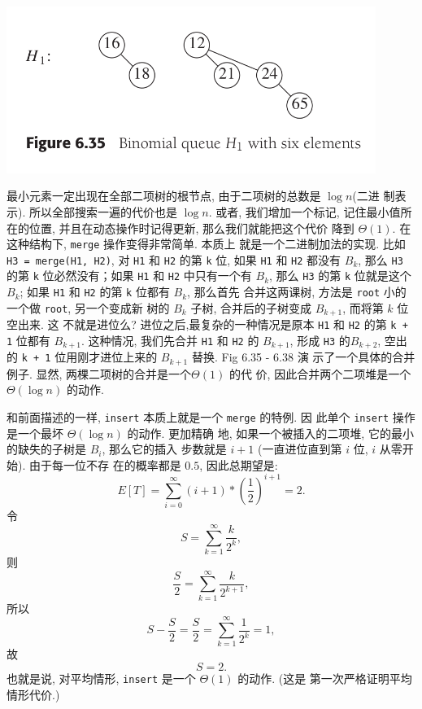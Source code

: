 \documentclass[a4paper]{ctexart}
\theoremstyle{definition}
\theoremstyle{definition}
\begin{document}
\begin{center}
  \includegraphics[width=0.9\textwidth]{images/B-tree.png}
\end{center}


最小元素一定出现在全部二项树的根节点, 由于二项树的总数是 $\log n$(二进
制表示). 所以全部搜索一遍的代价也是 $\log n$. 或者, 我们增加一个标记,
记住最小值所在的位置, 并且在动态操作时记得更新, 那么我们就能把这个代价
降到 $\Theta(1)$. 在这种结构下, \verb|merge| 操作变得非常简单. 本质上
就是一个二进制加法的实现. 比如 \verb|H3 = merge(H1, H2)|, 对 \verb|H1|
和 \verb|H2| 的第 \verb|k| 位, 如果 \verb|H1| 和 \verb|H2| 都没有
$B_k$, 那么 \verb|H3| 的第 \verb|k| 位必然没有；如果 \verb|H1| 和
\verb|H2| 中只有一个有 $B_k$, 那么 \verb|H3| 的第 \verb|k| 位就是这个
$B_k$; 如果 \verb|H1| 和 \verb|H2| 的第 \verb|k| 位都有 $B_k$, 那么首先
合并这两课树, 方法是 \verb|root| 小的一个做 \verb|root|, 另一个变成新
树的 $B_k$ 子树, 合并后的子树变成 $B_{k + 1}$, 而将第 $k$ 位空出来. 这
不就是进位么? 进位之后,最复杂的一种情况是原本 \verb|H1| 和 \verb|H2|
的第 \verb|k + 1| 位都有 $B_{k + 1}$. 这种情况, 我们先合并 \verb|H1|
和 \verb|H2| 的 $B_{k + 1}$, 形成 \verb|H3| 的$B_{k + 2}$, 空出的
\verb|k + 1| 位用刚才进位上来的 $B_{k + 1}$ 替换.  Fig 6.35 - 6.38 演
示了一个具体的合并例子.  显然, 两棵二项树的合并是一个$\Theta(1)$ 的代
价, 因此合并两个二项堆是一个 $\Theta(\log n)$ 的动作.

和前面描述的一样, \verb|insert| 本质上就是一个 \verb|merge| 的特例. 因
此单个 \verb|insert| 操作是一个最坏 $\Theta(\log n)$ 的动作. 更加精确
地, 如果一个被插入的二项堆, 它的最小的缺失的子树是 $B_i$, 那么它的插入
步数就是 $i + 1$ (一直进位直到第 $i$ 位, $i$ 从零开始). 由于每一位不存
在的概率都是 $0.5$, 因此总期望是:
$$
E[T] = \sum_{i = 0}^\infty (i + 1) * \left(\frac{1}{2}\right)^{i +
  1} = 2.
$$
令
$$
S = \sum_{k = 1}^\infty \frac{k}{2^k},
$$
则
$$
\frac{S}{2} = \sum_{k = 1}^\infty \frac{k}{2^{k + 1}},
$$
所以
$$
S - \frac{S}{2} = \frac{S}{2} = \sum_{k = 1}^\infty \frac{1}{2^k} = 1,
$$
故
$$
S = 2.
$$
也就是说, 对平均情形, \verb|insert| 是一个 $\Theta(1)$ 的动作. (这是
第一次严格证明平均情形代价.)
\end{document}

